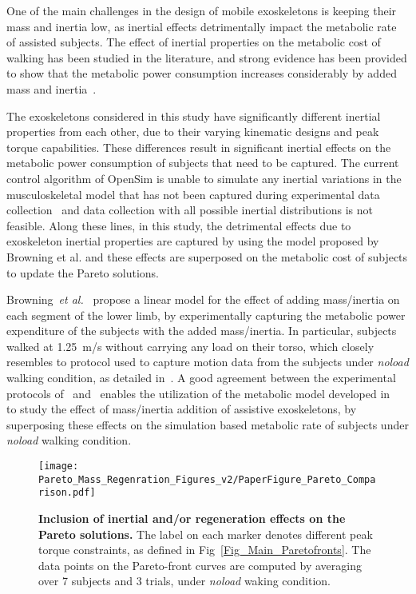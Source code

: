 \documentclass[10pt,letterpaper]{article}
\newcommand{\etal}{\textit{et al.}}
\begin{document}
One of the main challenges in the design of mobile exoskeletons is keeping their mass and inertia low, as inertial effects detrimentally impact the metabolic rate of assisted subjects. The effect of inertial properties on the metabolic cost of walking has been studied in the literature, and strong evidence has been provided to show that the metabolic power consumption increases considerably by added mass and inertia~\cite{Browning2007,Royer2005,Soule1969}.

The exoskeletons considered in this study have significantly different inertial properties from each other, due to their varying kinematic designs and peak torque capabilities. These differences result in significant inertial effects on the metabolic power consumption of subjects that need to be captured. The current control algorithm of OpenSim is unable to simulate any inertial variations in the musculoskeletal model that has not been captured during experimental data collection~\cite{Hicks2015} and data collection with all possible inertial distributions is not feasible. Along these lines, in this study, the detrimental effects due to exoskeleton inertial properties are captured by using the model proposed by Browning et al.\cite{Browning2007} and these effects are superposed on the metabolic cost of subjects to update the Pareto solutions.


Browning~\etal~\cite{Browning2007} propose a linear model for the effect of adding mass/inertia on each segment of the lower limb, by experimentally capturing the metabolic power expenditure of the subjects with the added mass/inertia. In particular, subjects walked at 1.25~m/s without carrying any load on their torso, which closely resembles to protocol used to capture motion data from the subjects under \textit{noload} walking condition, as detailed in~\cite{Dembia2017}. A good agreement between the experimental protocols of~\cite{Browning2007} and~\cite{Dembia2017} enables the utilization of the metabolic model developed in~\cite{Browning2007} to study the effect of mass/inertia addition of assistive exoskeletons, by superposing these effects on the simulation based metabolic rate of subjects under \emph{noload} walking condition.

\begin{figure*}[ht]
	\centering
	\texttt{[image: Pareto\_Mass\_Regenration\_Figures\_v2/PaperFigure\_Pareto\_Comparison.pdf]}
	\vspace{-3mm}
	\caption{{\small\textbf{Inclusion of inertial and/or regeneration effects on the Pareto solutions.} The label on each marker denotes different peak torque constraints, as defined in Fig~\ref{Fig_Main_Paretofronts}. The data points on the Pareto-front curves are computed by averaging over 7 subjects and 3 trials, under \emph{noload} waking condition.}}
	\label{Fig_Paretofronts_Mass_Regeneration_Effect_Comparison}
\end{figure*}
\end{document}
